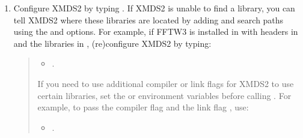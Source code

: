 \documentclass[letterpaper,10pt,english]{sphinxmanual}
\begin{document}
\begin{enumerate}
\begin{description}
\begin{itemize}
\begin{description}
\sphinxAtStartPar
If this results in an error, you may need to run 

\sphinxAtStartPar
The generated html documentation will then be found at xmds\sphinxhyphen{}3.1.0/documentation/index.html

\end{description}

\end{itemize}

\end{description}

\item {} 
\sphinxAtStartPar
Configure XMDS2 by typing .  If XMDS2 is unable to find a library, you can tell XMDS2 where these libraries are located by adding  and  search paths using the  and  options.  For example, if FFTW3 is installed in  with headers in  and the libraries in , (re)configure XMDS2 by typing:
\begin{quote}
\begin{itemize}
\item {} 
\sphinxAtStartPar
{}.

\end{itemize}

\sphinxAtStartPar
If you need to use additional compiler or link flags for XMDS2 to use certain libraries, set the  or  environment variables before calling .  For example, to pass the compiler flag  and the link flag , use:
\begin{itemize}
\item {} 
\sphinxAtStartPar
{}.

\end{itemize}
\end{quote}

\end{enumerate}
\end{document}
